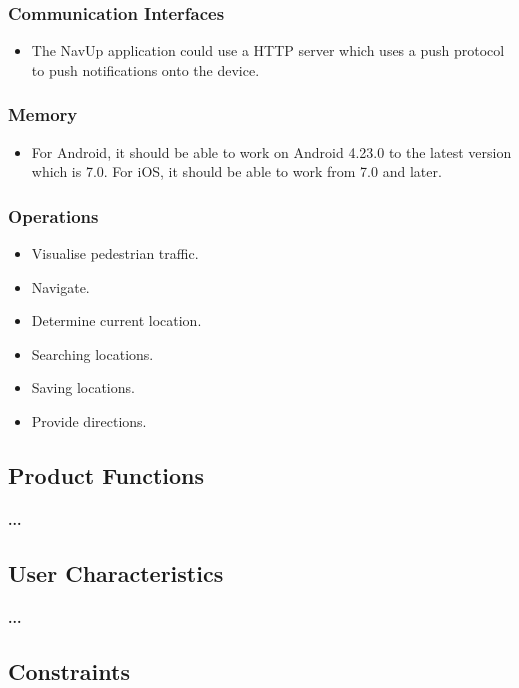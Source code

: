 \documentclass[runningheads,a4paper]{article}
\begin{document}
\subsubsection{Communication Interfaces}
\begin{itemize}
	\item 	The NavUp application could use a HTTP server which uses a push protocol to push notifications onto the device.
\end{itemize}
\subsubsection{Memory}
\begin{itemize}
	\item For Android, it should be able to work on Android 4.23.0 to the latest version which is 7.0. For iOS, it should be able to work from 7.0 and later.
	
\end{itemize}
\subsubsection{Operations}
\begin{itemize}
	\item Visualise pedestrian traffic.
	\item Navigate.
	\item Determine current location.
	\item Searching locations.
	\item Saving locations.
	\item Provide directions.
	
\end{itemize}

\subsection{Product Functions}
\paragraph{...}
\subsection{User Characteristics}
\paragraph{...}
\subsection{Constraints}
\end{document}
